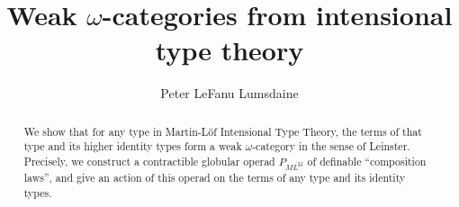 \documentclass{LMCS}
\theoremstyle{plain}
\newcommand{\MLfrag}{\mathit{ML}^\Id}
\renewcommand{\P}{P_{\MLfrag}}
\newcommand{\Id}{\mathrm{Id}}
\begin{document}

\title[Weak $\omega$-categories from ITT]{Weak $\omega$-categories from intensional type theory}  

\author[P.~LeF.~Lumsdaine]{Peter LeFanu Lumsdaine}

\address{Department of Mathematics, Carnegie Mellon Univerisity, Pittsburgh, U.S.A.}




\begin{abstract}
\noindent We show that for any type in Martin-L\"o{}f Intensional Type Theory, the terms of that type and its higher identity types form a weak $\omega$-category in the sense of Leinster.  Precisely, we construct a contractible globular operad $\P$ of definable ``composition laws'', and give an action of this operad on the terms of any type and its identity types.
\end{abstract}

\maketitle
\tableofcontents\vfill\eject












\end{document}
